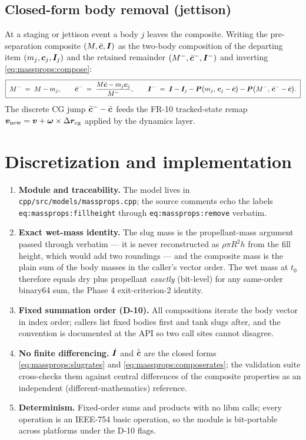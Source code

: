 \subsection{Closed-form body removal (jettison)}

At a staging or jettison event a body $j$ leaves the composite. Writing
the pre-separation composite $(M, \bar{\bm{c}}, \bm{I})$ as the
two-body composition of the departing item
$(m_j, \bm{c}_j, \bm{I}_j)$ and the retained remainder
$(M^-, \bar{\bm{c}}^-, \bm{I}^-)$ and inverting
\eqref{eq:massprops:compose}:
\begin{equation}
  \boxed{\;
  M^- \;=\; M - m_j, \qquad
  \bar{\bm{c}}^- \;=\; \frac{M \bar{\bm{c}} - m_j \bm{c}_j}{M^-}, \qquad
  \bm{I}^- \;=\; \bm{I} - \bm{I}_j
    - \bm{P}\bigl(m_j,\, \bm{c}_j - \bar{\bm{c}}\bigr)
    - \bm{P}\bigl(M^-,\, \bar{\bm{c}}^- - \bar{\bm{c}}\bigr).\;}
  \label{eq:massprops:remove}
\end{equation}
The discrete CG jump $\bar{\bm{c}}^- - \bar{\bm{c}}$ feeds the FR-10
tracked-state remap
$\bm{v}_{\mathrm{new}} = \bm{v} + \bm{\omega} \times
\Delta\bm{r}_{\mathrm{cg}}$ applied by the dynamics layer.

\section{Discretization and implementation}
\label{sec:massprops:implementation}

\begin{enumerate}
  \item \textbf{Module and traceability.} The model lives in
    \texttt{cpp/src/models/massprops.cpp}; the source comments echo the
    labels \texttt{eq:massprops:fillheight} through
    \texttt{eq:massprops:remove} verbatim.
  \item \textbf{Exact wet-mass identity.} The slug mass is the
    propellant-mass argument passed through verbatim --- it is never
    reconstructed as $\rho \pi R^2 h$ from the fill height, which would
    add two roundings --- and the composite mass is the plain sum of the
    body masses in the caller's vector order. The wet mass at $t_0$
    therefore equals dry plus propellant \emph{exactly} (bit-level) for
    any same-order binary64 sum, the Phase 4 exit-criterion-2 identity.
  \item \textbf{Fixed summation order (D-10).} All compositions iterate
    the body vector in index order; callers list fixed bodies first and
    tank slugs after, and the convention is documented at the API so two
    call sites cannot disagree.
  \item \textbf{No finite differencing.} $\dot{\bm{I}}$ and
    $\dot{\bar{\bm{c}}}$ are the closed forms
    \eqref{eq:massprops:slugrates} and
    \eqref{eq:massprops:composerates}; the validation suite
    cross-checks them against central differences of the composite
    properties as an independent (different-mathematics) reference.
  \item \textbf{Determinism.} Fixed-order sums and products with no
    libm calls; every operation is an IEEE-754 basic operation, so the
    module is bit-portable across platforms under the D-10 flags.
\end{enumerate}

